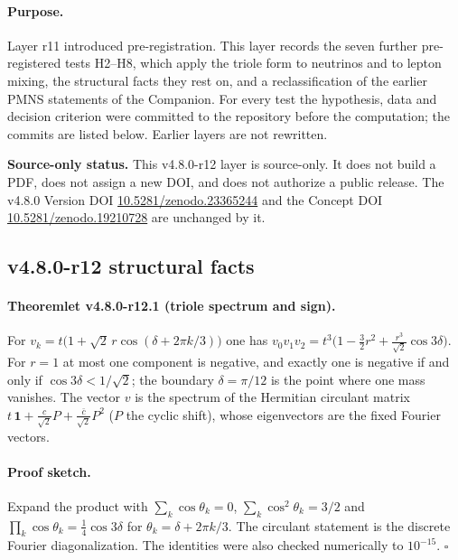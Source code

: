 \paragraph{Purpose.}
Layer r11 introduced pre-registration.  This layer records the seven further pre-registered tests
H2--H8, which apply the triole form to neutrinos and to lepton mixing, the structural facts they rest on,
and a reclassification of the earlier PMNS statements of the Companion.  For every test the hypothesis,
data and decision criterion were committed to the repository before the computation; the commits are
listed below.  Earlier layers are not rewritten.

\noindent\textbf{Source-only status.}
This v4.8.0-r12 layer is source-only.  It does not build a PDF, does not assign a new DOI,
and does not authorize a public release.  The v4.8.0 Version DOI
\href{https://doi.org/10.5281/zenodo.23365244}{10.5281/zenodo.23365244} and the Concept DOI
\href{https://doi.org/10.5281/zenodo.19210728}{10.5281/zenodo.19210728} are unchanged by it.

\subsection*{v4.8.0-r12 structural facts}
\label{subsec:v480-r12-structure}

\paragraph{Theoremlet v4.8.0-r12.1 (triole spectrum and sign).}
For \(v_k=t\bigl(1+\sqrt2\,r\cos(\delta+2\pi k/3)\bigr)\) one has
\(v_0v_1v_2=t^3\bigl(1-\tfrac32r^2+\tfrac{r^3}{\sqrt2}\cos3\delta\bigr)\).  For \(r=1\) at most one
component is negative, and exactly one is negative if and only if \(\cos3\delta<1/\sqrt2\); the boundary
\(\delta=\pi/12\) is the point where one mass vanishes.  The vector \(v\) is the spectrum of the Hermitian
circulant matrix \(t\,\mathbf 1+\tfrac{c}{\sqrt2}P+\tfrac{\bar c}{\sqrt2}P^2\) (\(P\) the cyclic shift),
whose eigenvectors are the fixed Fourier vectors.

\paragraph{Proof sketch.}
Expand the product with \(\sum_k\cos\theta_k=0\), \(\sum_k\cos^2\theta_k=3/2\) and
\(\prod_k\cos\theta_k=\tfrac14\cos3\delta\) for \(\theta_k=\delta+2\pi k/3\).  The circulant statement is the
discrete Fourier diagonalization.  The identities were also checked numerically to \(10^{-15}\).  \(\square\)

